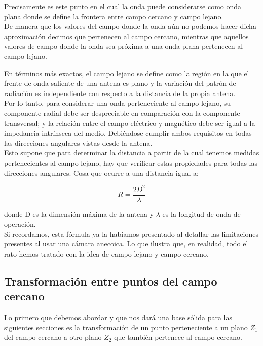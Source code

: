 \documentclass{article}
\begin{document}
Precisamente es este punto en el cual la onda puede considerarse como onda plana donde se define la frontera entre campo cercano y campo lejano.\\ 
De manera que los valores del campo donde la onda aún no podemos hacer dicha aproximación decimos que pertenecen al campo cercano, mientras que aquellos valores de campo donde la onda sea próxima a una onda plana pertenecen al campo lejano. 

\newpage

En términos más exactos, el campo lejano se define como la región en la que el frente de onda saliente de una antena es plano y la variación del patrón de radiación es independiente con respecto a la distancia de la propia antena.\\
Por lo tanto, para considerar una onda perteneciente al campo lejano, su componente radial debe ser despreciable en comparación con la componente transversal; y la relación entre el campo eléctrico y magnético debe ser igual a la impedancia intrínseca del medio. Debiéndose cumplir ambos requisitos en todas las direcciones angulares vistas desde la antena.
\\

Esto supone que para determinar la distancia a partir de la cual tenemos medidas pertenecientes al campo lejano, hay que verificar estas propiedades para todas las direcciones angulares. Cosa que ocurre a una distancia igual a:

\begin{equation}
                            R =\frac{2D^2}{\lambda}
\end{equation}

donde D es la dimensión máxima de la antena y $\lambda$ es la longitud de onda de operación.\\

Si recordamos, esta fórmula ya la habíamos presentado al detallar las limitaciones presentes al usar una cámara anecoica. Lo que ilustra que, en realidad, todo el rato hemos tratado con la idea de campo lejano y campo cercano.
\newpage

\subsection{Transformación entre puntos del campo cercano}

Lo primero que debemos abordar y que nos dará una base sólida para las siguientes secciones es la transformación de un punto perteneciente a un plano $Z_1$ del campo cercano a otro plano $Z_2$ que también pertenece al campo cercano.
\end{document}
